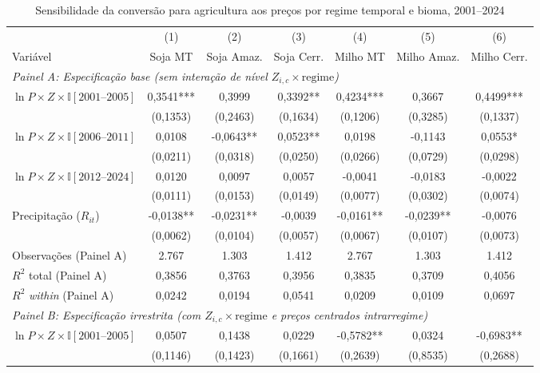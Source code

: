 \begin{table}[htbp]
\centering
\footnotesize
\setlength{\tabcolsep}{3.2pt}
\captionstyle{\centering}
\normalcaption
\caption{Sensibilidade da conversão para agricultura aos preços por regime temporal e bioma, 2001--2024}
\label{tab:h1-regimes-biomas}
\begin{tabular}{lcccccc}
\toprule
 & (1) & (2) & (3) & (4) & (5) & (6) \\
Variável & Soja MT & Soja Amaz. & Soja Cerr. & Milho MT & Milho Amaz. & Milho Cerr. \\
\midrule
\multicolumn{7}{l}{\textit{Painel A: Especificação base (sem interação de nível $Z_{i,c} \times \text{regime}$)}} \\
$\ln P \times Z \times \mathbb{I}[2001\text{--}2005]$ & 0,3541*** & 0,3999 & 0,3392** & 0,4234*** & 0,3667 & 0,4499*** \\
 & (0,1353) & (0,2463) & (0,1634) & (0,1206) & (0,3285) & (0,1337) \\
$\ln P \times Z \times \mathbb{I}[2006\text{--}2011]$ & 0,0108 & -0,0643** & 0,0523** & 0,0198 & -0,1143 & 0,0553* \\
 & (0,0211) & (0,0318) & (0,0250) & (0,0266) & (0,0729) & (0,0298) \\
$\ln P \times Z \times \mathbb{I}[2012\text{--}2024]$ & 0,0120 & 0,0097 & 0,0057 & -0,0041 & -0,0183 & -0,0022 \\
 & (0,0111) & (0,0153) & (0,0149) & (0,0077) & (0,0302) & (0,0074) \\
Precipitação ($R_{it}$) & -0,0138** & -0,0231** & -0,0039 & -0,0161** & -0,0239** & -0,0076 \\
 & (0,0062) & (0,0104) & (0,0057) & (0,0067) & (0,0107) & (0,0073) \\
Observações (Painel A) & 2.767 & 1.303 & 1.412 & 2.767 & 1.303 & 1.412 \\
$R^2$ total (Painel A) & 0,3856 & 0,3763 & 0,3956 & 0,3835 & 0,3709 & 0,4056 \\
$R^2$ \textit{within} (Painel A) & 0,0242 & 0,0194 & 0,0541 & 0,0209 & 0,0109 & 0,0697 \\
\midrule
\multicolumn{7}{l}{\textit{Painel B: Especificação irrestrita (com $Z_{i,c} \times \text{regime}$ e preços centrados intrarregime)}} \\
$\ln P \times Z \times \mathbb{I}[2001\text{--}2005]$ & 0,0507 & 0,1438 & 0,0229 & -0,5782** & 0,0324 & -0,6983** \\
 & (0,1146) & (0,1423) & (0,1661) & (0,2639) & (0,8535) & (0,2688) \\

\end{tabular}
\end{table}
